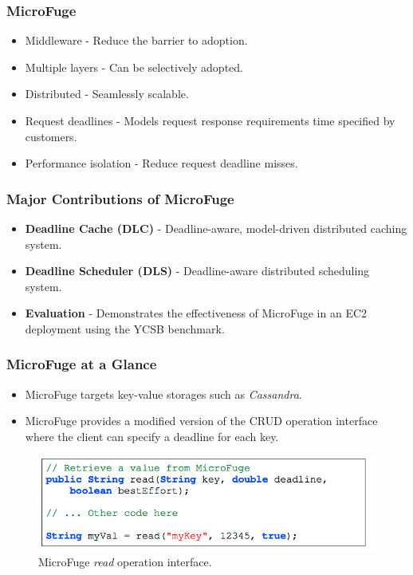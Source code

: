 \documentclass{beamer}
\begin{document}
\begin{frame}
  \frametitle{MicroFuge}
    \begin{itemize}
    \item Middleware - Reduce the barrier to adoption.
    \item Multiple layers - Can be selectively adopted.
    \item Distributed - Seamlessly scalable.
    \item Request deadlines - Models request response requirements time
      specified by customers.
    \item Performance isolation - Reduce request deadline misses.
    \end{itemize}
\end {frame}


\begin{frame}
  \frametitle{Major Contributions of MicroFuge}
  \begin{itemize}
  \item \textbf{Deadline Cache (DLC)} - Deadline-aware, model-driven distributed
    caching system.
  \item \textbf{Deadline Scheduler (DLS)} - Deadline-aware distributed scheduling system.
  \item \textbf{Evaluation} - Demonstrates the effectiveness of MicroFuge in
    an EC2 deployment using the YCSB benchmark.
  \end{itemize}
\end {frame}



\begin{frame}
  \frametitle{MicroFuge at a Glance}
  \begin{itemize}
  \item MicroFuge targets key-value storages such as \textit{Cassandra}.
  \item MicroFuge provides a modified version of the CRUD operation interface
    where the client can specify a deadline for each key.
  \end{itemize}
  \begin{figure}
  \includegraphics[scale=0.40]{img/MicroFuge_protocol.png}
  \caption{MicroFuge \textit{read} operation interface.}
  \end{figure}
\end{frame}
\end{document}
